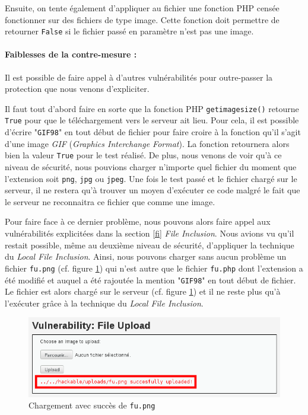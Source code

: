 Ensuite, on tente également d'appliquer au fichier une fonction PHP censée fonctionner sur des fichiers de type image. Cette fonction doit permettre de retourner \texttt{False} si le fichier passé en paramètre n'est pas une image.

\paragraph{Faiblesses de la contre-mesure :}

Il est possible de faire appel à d'autres vulnérabilités pour outre-passer la protection que nous venons d'expliciter.

Il faut tout d'abord faire en sorte que la fonction PHP \texttt{getimagesize()} retourne \texttt{True} pour que le téléchargement vers le serveur ait lieu. Pour cela, il est possible d'écrire "\texttt{GIF98}" en tout début de fichier pour faire croire à la fonction qu'il s'agit d'une image \textit{GIF} (\textit{Graphics Interchange Format}). La fonction retournera alors bien la valeur \texttt{True} pour le test réalisé. De plus, nous venons de voir qu'à ce niveau de sécurité, nous pouvions charger n'importe quel fichier du moment que l'extension soit \texttt{png}, \texttt{jpg} ou \texttt{jpeg}. Une fois le test passé et le fichier chargé sur le serveur, il ne restera qu'à trouver un moyen d'exécuter ce code malgré le fait que le serveur ne reconnaitra ce fichier que comme une image.

Pour faire face à ce dernier problème, nous pouvons alors faire appel aux vulnérabilités explicitées dans la section \ref{fi} \textit{File Inclusion}. Nous avions vu qu'il restait possible, même au deuxième niveau de sécurité, d'appliquer la technique du \textit{Local File Inclusion}. Ainsi, nous pouvons charger sans aucun problème un fichier \texttt{fu.png} (cf. figure \ref{fu_dvwa6}) qui n'est autre que le fichier \texttt{fu.php} dont l'extension a été modifié et auquel a été rajoutée la mention "\texttt{GIF98}" en tout début de fichier. Le fichier est alors chargé sur le serveur (cf. figure \ref{fu_dvwa6}) et il ne reste plus qu'à l'exécuter grâce à la technique du \textit{Local File Inclusion}.

\begin{figure}[!h]
\begin{center}
\includegraphics[scale=.5]{images/fu6.png}

\caption{Chargement avec succès de \texttt{fu.png}}
\label{fu_dvwa6}
\end{center}
\end{figure}

